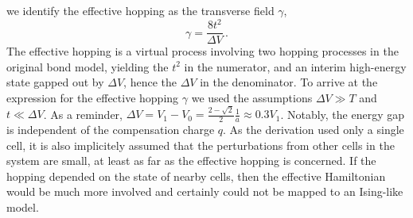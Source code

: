 %
we identify the effective hopping as the transverse field $\gamma$,
%
\begin{equation}
  \label{eq:gamma}
  \gamma = \frac{8 t^2}{\Delta V} \, .
\end{equation}
%
The effective hopping is a virtual process involving two hopping processes in
the original bond model, yielding the $t^2$ in the numerator, and an interim
high-energy state gapped out by $\Delta V$, hence the $\Delta V$ in the
denominator. To arrive at the expression for the effective hopping $\gamma$ we
used the assumptions $\Delta V \gg T$ and $t \ll \Delta V$. As a reminder,
$\Delta V = V_1 - V_0 = \frac{2 - \sqrt{2}}{2} \frac{1}{a} \approx 0.3 V_1$.
Notably, the energy gap is independent of the compensation charge $q$. As the
derivation used only a single cell, it is also implicitely assumed that the
perturbations from other cells in the system are small, at least as far as the
effective hopping is concerned. If the hopping depended on the state of nearby
cells, then the effective Hamiltonian would be much more involved and certainly
could not be mapped to an Ising-like model.

